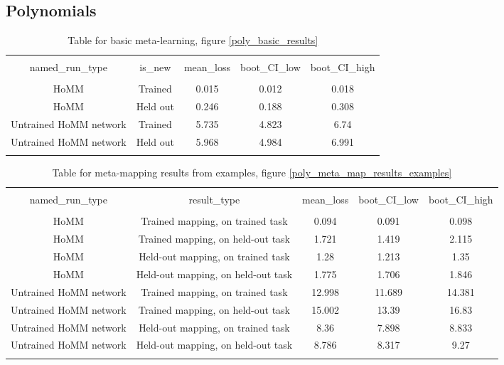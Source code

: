 \subsection{Polynomials}
\begin{table}[H]
\scriptsize
\centering
\begin{tabular}{@{\extracolsep{5pt}} ccccc}
\\[-1.8ex]\hline
\hline \\[-1.8ex]
named\_run\_type & is\_new & mean\_loss & boot\_CI\_low & boot\_CI\_high \\
\hline \\[-1.8ex]
HoMM & Trained & 0.015 & 0.012 & 0.018 \\
HoMM & Held out & 0.246 & 0.188 & 0.308 \\
Untrained HoMM network & Trained & 5.735 & 4.823 & 6.74 \\
Untrained HoMM network & Held out & 5.968 & 4.984 & 6.991 \\
\hline \\[-1.8ex]
\end{tabular}
\caption{Table for basic meta-learning, figure \ref{poly_basic_results}}
\end{table}

\begin{table}[H]
\scriptsize
\centering
\begin{tabular}{@{\extracolsep{5pt}} ccccc}
\\[-1.8ex]\hline
\hline \\[-1.8ex]
named\_run\_type & result\_type & mean\_loss & boot\_CI\_low & boot\_CI\_high \\
\hline \\[-1.8ex]
HoMM & Trained mapping, on trained task & 0.094 & 0.091 & 0.098 \\
HoMM & Trained mapping, on held-out task & 1.721 & 1.419 & 2.115 \\
HoMM & Held-out mapping, on trained task & 1.28 & 1.213 & 1.35 \\
HoMM & Held-out mapping, on held-out task & 1.775 & 1.706 & 1.846 \\
Untrained HoMM network & Trained mapping, on trained task & 12.998 & 11.689 & 14.381 \\
Untrained HoMM network & Trained mapping, on held-out task & 15.002 & 13.39 & 16.83 \\
Untrained HoMM network & Held-out mapping, on trained task & 8.36 & 7.898 & 8.833 \\
Untrained HoMM network & Held-out mapping, on held-out task & 8.786 & 8.317 & 9.27 \\
\hline \\[-1.8ex]
\end{tabular}
\caption{Table for meta-mapping results from examples, figure \ref{poly_meta_map_results_examples}}
\end{table}

